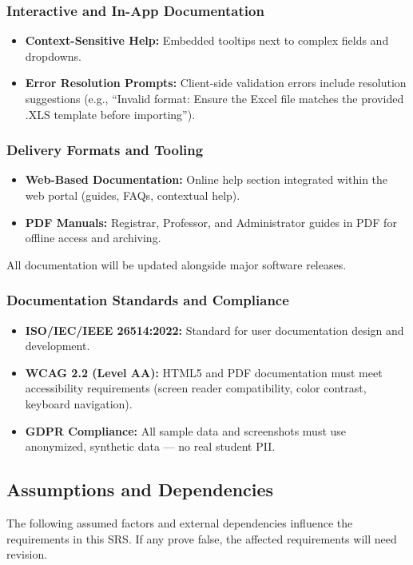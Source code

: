 \documentclass[11pt, a4paper]{article}
\begin{document}
\subsubsection{Interactive and In-App Documentation}
\begin{itemize}
    \item \textbf{Context-Sensitive Help:} Embedded tooltips next to complex fields and dropdowns.
    \item \textbf{Error Resolution Prompts:} Client-side validation errors include resolution suggestions (e.g., ``Invalid format: Ensure the Excel file matches the provided .XLS template before importing'').
\end{itemize}

\subsubsection{Delivery Formats and Tooling}
\begin{itemize}
    \item \textbf{Web-Based Documentation:} Online help section integrated within the web portal (guides, FAQs, contextual help).
    \item \textbf{PDF Manuals:} Registrar, Professor, and Administrator guides in PDF for offline access and archiving.
\end{itemize}
All documentation will be updated alongside major software releases.

\subsubsection{Documentation Standards and Compliance}
\begin{itemize}
    \item \textbf{ISO/IEC/IEEE 26514:2022:} Standard for user documentation design and development.
    \item \textbf{WCAG 2.2 (Level AA):} HTML5 and PDF documentation must meet accessibility requirements (screen reader compatibility, color contrast, keyboard navigation).
    \item \textbf{GDPR Compliance:} All sample data and screenshots must use anonymized, synthetic data --- no real student PII.
\end{itemize}

\subsection{Assumptions and Dependencies}
The following assumed factors and external dependencies influence the requirements in this SRS. If any prove false, the affected requirements will need revision.
\end{document}
